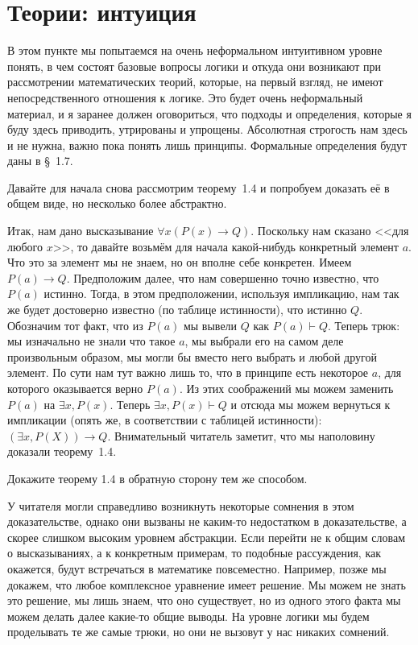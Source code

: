 \section{Теории: интуиция}

В этом пункте мы попытаемся на очень неформальном интуитивном уровне понять, в чем состоят базовые вопросы логики и откуда они возникают при рассмотрении математических теорий, которые, на первый взгляд, не имеют непосредственного отношения к логике. Это будет очень неформальный материал, и я заранее должен оговориться, что подходы и определения, которые я буду здесь приводить, утрированы и упрощены. Абсолютная строгость нам здесь и не нужна, важно пока понять лишь принципы. Формальные определения будут даны в \S~1.7.

Давайте для начала снова рассмотрим теорему~1.4 и попробуем доказать её в общем виде, но несколько более абстрактно.

Итак, нам дано высказывание $\forall x (P(x)\to Q)$. Поскольку нам сказано <<для любого $x$>>, то давайте возьмём для начала какой-нибудь конкретный элемент $a$. Что это за элемент мы не знаем, но он вполне себе конкретен. Имеем $P(a)\to Q$. Предположим далее, что нам совершенно точно известно, что $P(a)$ истинно. Тогда, в этом предположении, используя импликацию, нам так же будет достоверно известно (по таблице истинности), что истинно $Q$. Обозначим тот факт, что из $P(a)$ мы вывели $Q$ как $P(a)\vdash Q$. Теперь трюк: мы изначально не знали что такое $a$, мы выбрали его на самом деле произвольным образом, мы могли бы вместо него выбрать и любой другой элемент. По сути нам тут важно лишь то, что  в принципе есть некоторое $a$, для которого оказывается верно $P(a)$. Из этих соображений мы можем заменить $P(a)$ на $\exists x, P(x)$. Теперь $\exists x, P(x) \vdash Q$ и отсюда мы можем вернуться к импликации (опять же, в соответствии с таблицей истинности): $(\exists x, P(X))\to Q$. Внимательный читатель заметит, что мы наполовину доказали теорему~1.4.

\begin{exercise}
Докажите теорему 1.4 в обратную сторону тем же способом.
\end{exercise}

У читателя могли справедливо возникнуть некоторые сомнения в этом доказательстве, однако они вызваны не каким-то недостатком в доказательстве, а скорее слишком высоким уровнем абстракции. Если перейти не к общим словам о высказываниях, а к конкретным примерам, то подобные рассуждения, как окажется, будут встречаться в математике повсеместно. Например, позже мы докажем, что любое комплексное уравнение имеет решение. Мы можем не знать это решение, мы лишь знаем, что оно существует, но из одного этого факта мы можем делать далее какие-то общие выводы. На уровне логики мы будем проделывать те же самые трюки, но они не вызовут у нас никаких сомнений.

